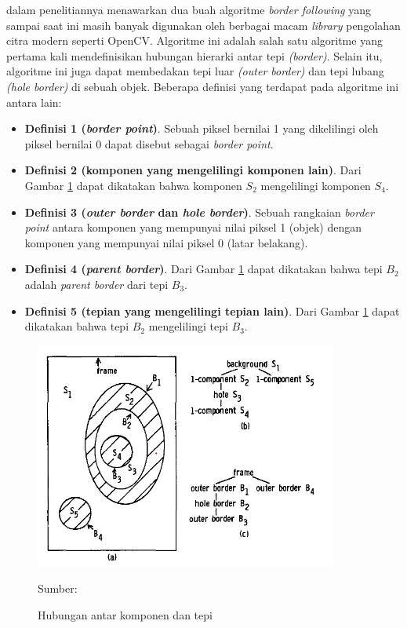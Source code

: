     \citet{Suzuki1985} dalam penelitiannya menawarkan dua buah algoritme \textit{border following} yang sampai saat ini masih banyak digunakan oleh berbagai macam \textit{library} pengolahan citra modern seperti OpenCV. Algoritme ini adalah salah satu algoritme yang pertama kali mendefinisikan hubungan hierarki antar tepi \textit{(border)}. Selain itu, algoritme ini juga dapat membedakan tepi luar \textit{(outer border)} dan tepi lubang \textit{(hole border)} di sebuah objek. Beberapa definisi yang terdapat pada algoritme ini antara lain:
    
    \begin{itemize}
        \item \textbf{Definisi 1 (\textit{border point})}. Sebuah piksel bernilai 1 yang dikelilingi oleh piksel bernilai 0 dapat disebut sebagai \textit{border point}.
        \item \textbf{Definisi 2 (komponen yang mengelilingi komponen lain)}. Dari Gambar \ref{fig:Hubungan-antar-komponen-dan-tepi} dapat dikatakan bahwa komponen $S_2$ mengelilingi komponen $S_4$.
        \item \textbf{Definisi 3 (\textit{outer border} dan  \textit{hole border})}. Sebuah rangkaian \textit{border point} antara komponen yang mempunyai nilai piksel 1 (objek) dengan komponen yang mempunyai nilai piksel 0 (latar belakang).
        \item \textbf{Definisi 4 (\textit{parent border})}. Dari Gambar \ref{fig:Hubungan-antar-komponen-dan-tepi} dapat dikatakan bahwa tepi $B_2$ adalah \textit{parent border} dari tepi $B_3$.
        \item \textbf{Definisi 5 (tepian yang mengelilingi tepian lain)}. Dari Gambar \ref{fig:Hubungan-antar-komponen-dan-tepi} dapat dikatakan bahwa tepi $B_2$ mengelilingi tepi $B_3$.
    \end{itemize}
    \begin{figure}[H]
    \centering
      \singlespacing
      \includegraphics[width=10cm]{image/surroundess.jpg}
      \caption{Hubungan antar komponen dan tepi}
      \small{Sumber: \citep{Suzuki1985}}
      \label{fig:Hubungan-antar-komponen-dan-tepi}
    \end{figure}
    
